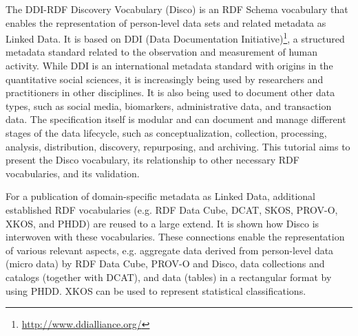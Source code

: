 \documentclass{llncs}
\begin{document}
The DDI-RDF Discovery Vocabulary (Disco)\cite{Bosch2012,Bosch2013} is an RDF Schema vocabulary that enables the representation of person-level data sets and related metadata as Linked Data.
It is based on DDI (Data Documentation Initiative)\footnote{\url{http://www.ddialliance.org/}}, a structured metadata standard related to the observation and measurement of human activity.
While DDI is an international metadata standard with origins in the quantitative social sciences, it is increasingly being used by researchers and practitioners in other disciplines. It is also being used to document other data types, such as social media, biomarkers, administrative data, and transaction data. The specification itself is modular and can document and manage different stages of the data lifecycle, such as conceptualization, collection, processing, analysis, distribution, discovery, repurposing, and archiving.
This tutorial aims to present the Disco vocabulary, its relationship to other necessary RDF vocabularies, and its validation.
 
For a publication of domain-specific metadata as Linked Data, additional established RDF vocabularies (e.g. RDF Data Cube, DCAT, SKOS, PROV-O, XKOS, and PHDD) are reused to a large extend. It is shown how Disco is interwoven with these vocabularies. 
These connections enable the representation of various relevant aspects, e.g. aggregate data derived from person-level data (micro data) by RDF Data Cube, PROV-O and Disco, data collections and catalogs (together with DCAT), and data (tables) in a rectangular format by using PHDD. XKOS can be used to represent statistical classifications.
\end{document}
